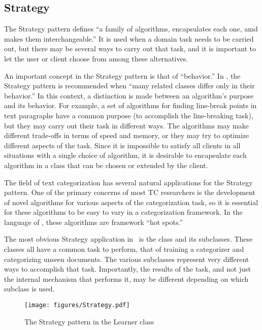 \subsection{Strategy}
\label{Strategy}

The Strategy pattern defines ``a family of algorithms, encapsulates
each one, amd makes them interchangeable.'' \cite[p. 315]{gamma:95}
It is used when a domain task needs to be carried out, but there may
be several ways to carry out that task, and it is important to let the
user or client choose from among these alternatives.

An important concept in the Strategy pattern is that of ``behavior.''
In \cite{gamma:95}, the Strategy pattern is recommended when ``many
related classes differ only in their behavior.''  In this context, a
distinction is made between an algorithm's purpose and its behavior.
For example, a set of algorithms for finding line-break points in text
paragraphs have a common purpose (to accomplish the line-breaking
task), but they may carry out their task in different ways.  The
algorithms may make different trade-offs in terms of speed and memory,
or they may try to optimize different aspects of the task.  Since it
is impossible to satisfy all clients in all situations with a single
choice of algorithm, it is desirable to encapsulate each algorithm in
a class that can be chosen or extended by the client.

The field of text categorization has several natural applications for
the Strategy pattern.  One of the primary concerns of most TC
researchers is the development of novel algorithms for various aspects
of the categorization task, so it is essential for these algorithms to
be easy to vary in a categorization framework.  In the language of
\cite{fayad:99}, these algorithms are framework ``hot spots.''

The most obvious Strategy application in \aicat\ is the
 class and its subclasses.  These classes all have a
common task to perform, that of training a categorizer and
categorizing unseen documents.  The various subclasses represent very
different ways to accomplish that task.  Importantly, the results of
the task, and not just the internal mechanism that performs it, may be
different depending on which  subclass is used.

\begin{figure}
\texttt{[image: figures/Strategy.pdf]}
\caption{The Strategy pattern in the Learner class}
\label{Strategy-learner}
\end{figure}


